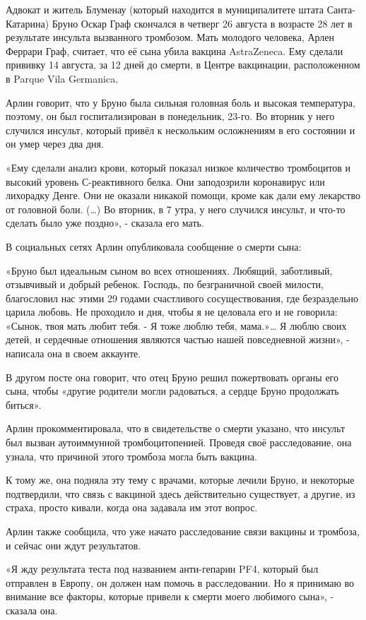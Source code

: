 Адвокат и житель Блуменау (который находится в муниципалитете штата
Санта-Катарина) Бруно Оскар Граф скончался в четверг 26 августа в возрасте 28
лет в результате инсульта вызванного тромбозом. Мать молодого человека, Арлен
Феррари Граф, считает, что её сына убила вакцина AstraZeneca. Ему сделали
прививку 14 августа, за 12 дней до смерти, в Центре вакцинации, расположенном в
Parque Vila Germanica.

Арлин говорит, что у Бруно была сильная головная боль и высокая температура,
поэтому, он был госпитализирован в понедельник, 23-го. Во вторник у него
случился инсульт, который привёл к нескольким осложнениям в его состоянии и он
умер через два дня.

«Ему сделали анализ крови, который показал низкое количество тромбоцитов и
высокий уровень С-реактивного белка. Они заподозрили коронавирус или лихорадку
Денге. Они не оказали никакой помощи, кроме как дали ему лекарство от головной
боли. (…) Во вторник, в 7 утра, у него случился инсульт, и что-то сделать было
уже поздно», - сказала его мать.

В социальных сетях Арлин опубликовала сообщение о смерти сына:

«Бруно был идеальным сыном во всех отношениях. Любящий, заботливый, отзывчивый и
добрый ребенок. Господь, по безграничной своей милости, благословил нас этими 29
годами счастливого сосуществования, где безраздельно царила любовь. Не проходило
и дня, чтобы я не целовала его и не говорила: «Сынок, твоя мать любит тебя. - Я
тоже люблю тебя, мама.»… Я люблю своих детей, и сердечные отношения являются
частью нашей повседневной жизни», - написала она в своем аккаунте.

В другом посте она говорит, что отец Бруно решил пожертвовать органы его сына,
чтобы «другие родители могли радоваться, а сердце Бруно продолжать биться».

Арлин прокомментировала, что в свидетельстве о смерти указано, что инсульт был
вызван аутоиммунной тромбоцитопенией. Проведя своё расследование, она узнала,
что причиной этого тромбоза могла быть вакцина.

К тому же, она подняла эту тему с врачами, которые лечили Бруно, и некоторые
подтвердили, что связь с вакциной здесь действительно существует, а другие, из
страха, просто кивали, когда она задавала им этот вопрос.

Арлин также сообщила, что уже начато расследование связи вакцины и тромбоза, и
сейчас они ждут результатов.

«Я жду результата теста под названием анти-гепарин PF4, который был отправлен в
Европу, он должен нам помочь в расследовании. Но я принимаю во внимание все
факторы, которые привели к смерти моего любимого сына», - сказала она.

